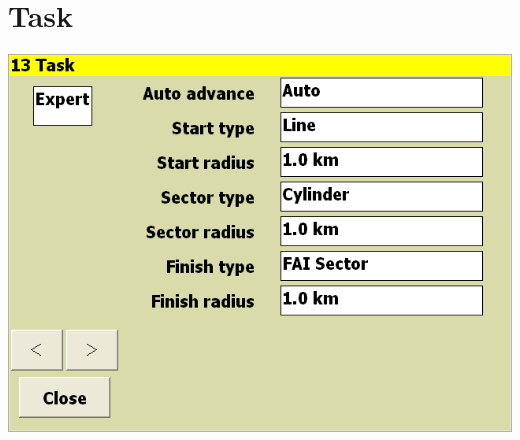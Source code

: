 \documentclass[a4paper,12pt]{refrep}
\begin{document}
\clearpage
\section{Task}

\begin{center}
\includegraphics[angle=0,width=\linewidth,keepaspectratio='true']{figures/config-11.png}
\end{center}
\end{document}
